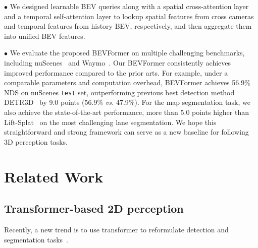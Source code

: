 \documentclass{article}
\begin{document}
$\bullet$ We designed learnable BEV queries along with a spatial cross-attention layer and a temporal self-attention layer to lookup spatial features from cross cameras and temporal features from history BEV, respectively, and then aggregate them into unified BEV features.

$\bullet$ We evaluate the proposed BEVFormer on multiple challenging benchmarks, including nuScenes~\cite{caesar2020nuscenes} and Waymo~\cite{sun2020scalability}.
Our BEVFormer consistently achieves improved performance compared to the prior arts.
For example, under a comparable parameters and computation overhead, BEVFormer achieves 56.9\% NDS on nuScenes \texttt{test} set, outperforming previous best detection method DETR3D~\cite{wang2022detr3d} by 9.0 points (56.9\% \emph{vs.} 47.9\%). For the map segmentation task, we also achieve  the state-of-the-art performance, more than 5.0 points higher than Lift-Splat~\cite{philion2020lift} on the most challenging lane segmentation.
We hope this straightforward and strong framework can serve as a new baseline for following 3D perception tasks.

\section{Related Work}

\subsection{Transformer-based 2D perception}
Recently, a new trend is to use transformer to reformulate detection and segmentation tasks~\cite{carion2020end,zhu2020deformable,li2021panoptic}. 
\end{document}
